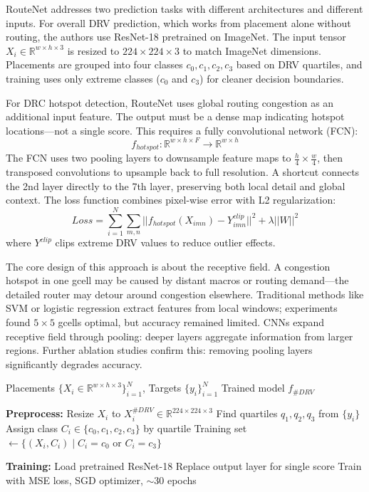 \documentclass[sigconf]{acmart}
\begin{document}
RouteNet addresses two prediction tasks with different architectures
and different inputs. For overall DRV prediction, which works from
placement alone without routing, the authors use ResNet-18 pretrained
on ImageNet. The input tensor $X_i \in \mathbb{R}^{w \times h \times 3}$
is resized to $224 \times 224 \times 3$ to match ImageNet dimensions.
Placements are grouped into four classes $c_0, c_1, c_2, c_3$ based on
DRV quartiles, and training uses only extreme classes ($c_0$ and $c_3$)
for cleaner decision boundaries.

For DRC hotspot detection, RouteNet uses global routing congestion
as an additional input feature. The output must be a dense map
indicating hotspot locations—not a single score. This requires a
fully convolutional network (FCN):
\begin{equation}
f_{hotspot}: \mathbb{R}^{w \times h \times F} \rightarrow \mathbb{R}^{w \times h}
\end{equation}
The FCN uses two pooling layers to downsample feature maps to
$\frac{h}{4} \times \frac{w}{4}$, then transposed convolutions to
upsample back to full resolution. A shortcut connects the 2nd layer
directly to the 7th layer, preserving both local detail and global
context. The loss function combines pixel-wise error with L2
regularization:
\begin{equation}
Loss = \sum_{i=1}^{N} \sum_{m,n} ||f_{hotspot}(X_{imn}) - Y^{clip}_{imn}||^2 + \lambda||W||^2
\end{equation}
where $Y^{clip}$ clips extreme DRV values to reduce outlier effects.

The core design of this approach is about the receptive field. A
congestion hotspot in one gcell may be caused by distant macros or
routing demand—the detailed router may detour around congestion
elsewhere. Traditional methods like SVM or logistic regression extract
features from local windows; experiments found $5 \times 5$ gcells
optimal, but accuracy remained limited. CNNs expand receptive field
through pooling: deeper layers aggregate information from larger
regions. Further ablation studies confirm this: removing pooling layers
significantly degrades accuracy.

\begin{algorithm}[h]
\caption{RouteNet \#DRV Prediction}
\label{alg:routenet}
\begin{algorithmic}[1]
\Require Placements $\{X_i \in \mathbb{R}^{w \times h \times 3}\}_{i=1}^{N}$, Targets $\{y_i\}_{i=1}^{N}$
\Ensure Trained model $f_{\#DRV}$

\State \textbf{Preprocess:}
    \State Resize $X_i$ to $X_i^{\#DRV} \in \mathbb{R}^{224 \times 224 \times 3}$
\EndFor
\State Find quartiles $q_1, q_2, q_3$ from $\{y_i\}$
\State Assign class $C_i \in \{c_0, c_1, c_2, c_3\}$ by quartile
\State Training set $\gets \{(X_i, C_i) \mid C_i = c_0 \text{ or } C_i = c_3\}$

\State \textbf{Training:}
\State Load pretrained ResNet-18
\State Replace output layer for single score
\State Train with MSE loss, SGD optimizer, $\sim$30 epochs
\end{algorithmic}
\end{algorithm}
\end{document}
